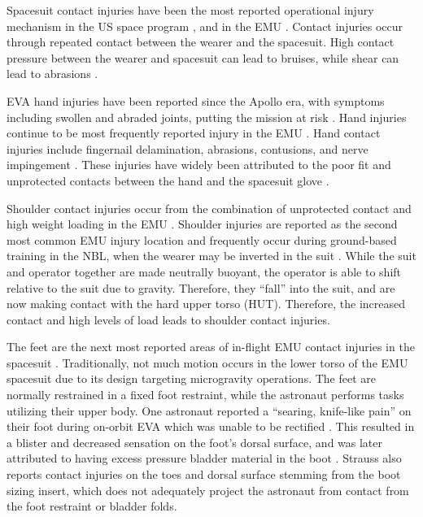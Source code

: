 \documentclass[defaultstyle,11pt]{thesis}
\begin{document}
Spacesuit contact injuries have been the most reported operational injury mechanism in the US space program \citep{Scheuring2008}, and in the EMU \citep{Strauss2004, Viegas2004, Scheuring2012}.
Contact injuries occur through repeated contact between the wearer and the spacesuit.
High contact pressure between the wearer and spacesuit can lead to bruises, while shear can lead to abrasions \citep{Mailler2004, Carlson2006}.

EVA hand injuries have been reported since the Apollo era, with symptoms including swollen and abraded joints, putting the mission at risk \citep{Scheuring2012}.
Hand injuries continue to be most frequently reported injury in the EMU \citep{Strauss2004, Viegas2004, Scheuring2012}.
Hand contact injuries include fingernail delamination, abrasions, contusions, and nerve impingement \citep{Strauss2004, Viegas2004, Scheuring2012}.
These injuries have widely been attributed to the poor fit and unprotected contacts between the hand and the spacesuit glove \citep{Strauss2004, Viegas2004}.

Shoulder contact injuries occur from the combination of unprotected contact and high weight loading in the EMU \citep{Strauss2004, Viegas2004, Anderson2015a}.
Shoulder injuries are reported as the second most common EMU injury location and frequently occur during ground-based training in the NBL, when the wearer may be inverted in the suit \citep{Strauss2004, Viegas2004}.
While the suit and operator together are made neutrally buoyant, the operator is able to shift relative to the suit due to gravity.
Therefore, they ``fall'' into the suit, and are now making contact with the hard upper torso (HUT).
Therefore, the increased contact and high levels of load leads to shoulder contact injuries.

The feet are the next most reported areas of in-flight EMU contact injuries in the spacesuit \citep{Scheuring2012}.
Traditionally, not much motion occurs in the lower torso of the EMU spacesuit due to its design targeting microgravity operations.
The feet are normally restrained in a fixed foot restraint, while the astronaut performs tasks utilizing their upper body.
One astronaut reported a ``searing, knife-like pain'' on their foot during on-orbit EVA which was unable to be rectified \citep{Scheuring2012}.
This resulted in a blister and decreased sensation on the foot's dorsal surface, and was later attributed to having excess pressure bladder material in the boot \citep{Scheuring2012}.
Strauss \citep{Strauss2004} also reports contact injuries on the toes and dorsal surface stemming from the boot sizing insert, which does not adequately project the astronaut from contact from the foot restraint or bladder folds.
\end{document}
